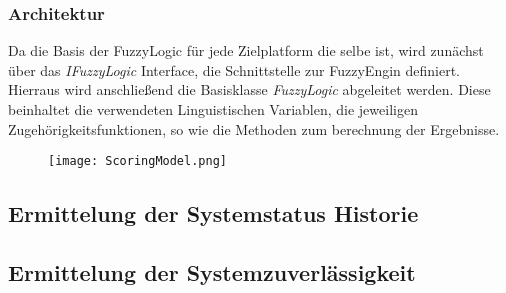 \subsubsection*{Architektur}
Da die Basis der FuzzyLogic für jede Zielplatform die selbe ist, wird zunächst über das \textit{IFuzzyLogic} Interface, die Schnittstelle zur FuzzyEngin definiert. Hierraus wird anschließend die Basisklasse \textit{FuzzyLogic} abgeleitet werden. Diese beinhaltet die verwendeten Linguistischen Variablen, die jeweiligen Zugehörigkeitsfunktionen, so wie die Methoden zum berechnung der Ergebnisse. 
\begin{center}
    \begin{figure}[h!]
        \centering
        \texttt{[image: ScoringModel.png]}
        \caption{}
        \label{fig:ScoringModel}
    \end{figure}
\end{center}
\vspace{-0.5cm}  
\subsection{Ermittelung der Systemstatus Historie}
\subsection{Ermittelung der Systemzuverlässigkeit}